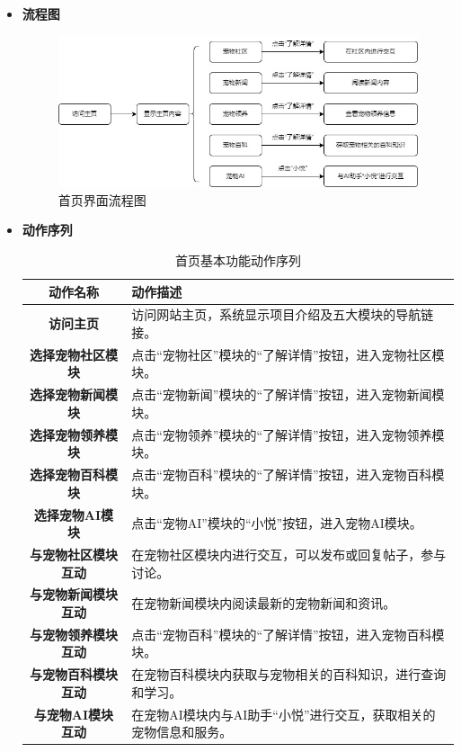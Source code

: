 \begin{itemize}
	\item \textbf{流程图}

	\begin{figure}[H]
		\centering
		\includegraphics[scale=0.5]{figures/HomepageBasicFunctions9.jpg} 
		\caption{首页界面流程图}
	\end{figure}

	\item \textbf{动作序列}

	\begin{table}[H]
		\centering
		\caption{首页基本功能动作序列}
		\renewcommand\arraystretch{1.5}
		\begin{tabular}{|c|>{\raggedright\arraybackslash}p{10cm}|}
			\hline
			\textbf{动作名称} & \textbf{动作描述} \\ \hline
			\textbf{访问主页} & 访问网站主页，系统显示项目介绍及五大模块的导航链接。 \\ \hline
			\textbf{选择宠物社区模块} & 点击“宠物社区”模块的“了解详情”按钮，进入宠物社区模块。 \\ \hline
			\textbf{选择宠物新闻模块} & 点击“宠物新闻”模块的“了解详情”按钮，进入宠物新闻模块。 \\ \hline
			\textbf{选择宠物领养模块} & 点击“宠物领养”模块的“了解详情”按钮，进入宠物领养模块。 \\ \hline
			\textbf{选择宠物百科模块} & 点击“宠物百科”模块的“了解详情”按钮，进入宠物百科模块。 \\ \hline
			\textbf{选择宠物AI模块} & 点击“宠物AI”模块的“小悦”按钮，进入宠物AI模块。 \\ \hline
			\textbf{与宠物社区模块互动} & 在宠物社区模块内进行交互，可以发布或回复帖子，参与讨论。 \\ \hline
			\textbf{与宠物新闻模块互动} & 在宠物新闻模块内阅读最新的宠物新闻和资讯。 \\ \hline
			\textbf{与宠物领养模块互动} & 点击“宠物百科”模块的“了解详情”按钮，进入宠物百科模块。 \\ \hline
			\textbf{与宠物百科模块互动} & 在宠物百科模块内获取与宠物相关的百科知识，进行查询和学习。 \\ \hline
			\textbf{与宠物AI模块互动} & 在宠物AI模块内与AI助手“小悦”进行交互，获取相关的宠物信息和服务。 \\ \hline
		\end{tabular}
	\end{table}


\end{itemize}
